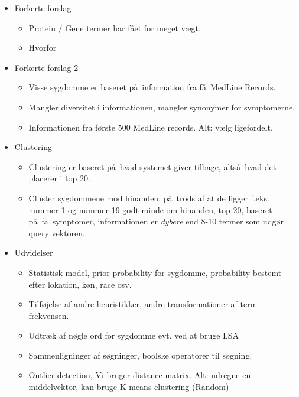 \documentclass[a4paper, 10pt, english, final]{report}
\begin{document}
\begin{itemize}
\begin{itemize}
\begin{itemize}
        \end{itemize}
      \item Forkerte forslag
        \begin{itemize}
          \item Protein / Gene termer har f\aa et for meget v\ae gt.
          \item Hvorfor
        \end{itemize}
      \item Forkerte forslag 2
        \begin{itemize}
          \item Visse sygdomme er baseret p\aa\ information fra
            f\aa\ MedLine Records.
          \item Mangler diversitet i informationen, mangler synonymer
            for symptomerne.
          \item Informationen fra f\o rste 500 MedLine records. Alt:
            v\ae lg ligefordelt.
        \end{itemize}
      \item Clustering
        \begin{itemize}
          \item Clustering er baseret p\aa\ hvad systemet giver tilbage, alts\aa\ hvad det placerer i top 20.
          \item Cluster sygdommene mod hinanden, p\aa\ trods af at de
            ligger f.eks. nummer 1 og nummer 19 godt minde om
            hinanden, top 20, baseret p\aa\ f\aa\ symptomer,
            informationen er \emph{dybere} end 8-10 termer som udg\o r
            query vektoren.
        \end{itemize}
      \item Udvidelser
        \begin{itemize}
          \item Statistisk model, prior probability for sygdomme,
            probability bestemt efter lokation, k\o n, race osv.
          \item Tilf\o jelse af andre heuristikker, andre
            transformationer af term frekvensen.
          \item Udtr\ae k af n\o gle ord for sygdomme evt. ved at
            bruge LSA
          \item Sammenligninger af s\o gninger, boolske operatorer til
            s\o gning.
          \item Outlier detection, Vi bruger distance matrix. Alt:
            udregne en middelvektor, kan bruge K-means clustering (Random)
        \end{itemize}
    \end{itemize}

\end{itemize}
\end{document}

